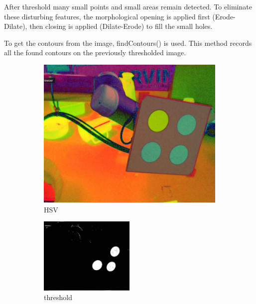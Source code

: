 After threshold many small points and small areas remain detected. To eliminate these disturbing features, the morphological 
opening is applied first (Erode-Dilate), then closing is applied (Dilate-Erode) to fill the small holes. 

To get the contours from the image, findContours() is used. This method records all the found contours on the previously thresholded
image.

\begin{figure}[ht!]
	\begin{subfigure}{.49\textwidth}
		\centering
		\includegraphics[width=\textwidth]{figures/color1}
	\caption{HSV}
	\label{fig:c1}
	\end{subfigure}
	\begin{subfigure}{\textwidth}
		\centering
\includegraphics[width=0.5\textwidth]{figures/color2}
	\caption{threshold}
	\label{fig:c2}
	\end{subfigure}
		\begin{subfigure}{.49\textwidth}
		\centering

\end{subfigure}
\end{figure}
